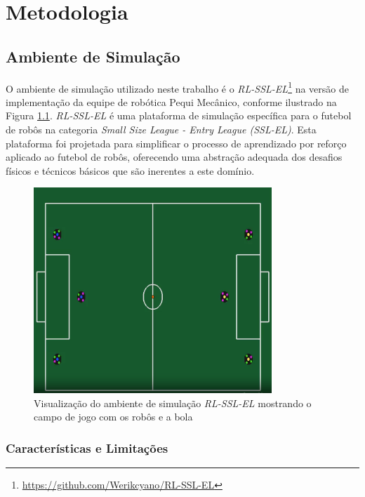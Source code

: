 \chapter{Metodologia}
\label{cap:metodologia}

\section{Ambiente de Simulação}
\label{sec:ambiente_simulacao}

O ambiente de simulação utilizado neste trabalho é o \textit{RL-SSL-EL}\footnote{\url{https://github.com/Werikcyano/RL-SSL-EL}} na versão de implementação da equipe de robótica Pequi Mecânico, conforme ilustrado na Figura \ref{fig:campo_simulacao}. \textit{RL-SSL-EL} é uma plataforma de simulação específica para o futebol de robôs na categoria \textit{Small Size League - Entry League (SSL-EL)}. Esta plataforma foi projetada para simplificar o processo de aprendizado por reforço aplicado ao futebol de robôs, oferecendo uma abstração adequada dos desafios físicos e técnicos básicos que são inerentes a este domínio.

\begin{figure}[h]
    \centering
    \includegraphics[width=0.8\textwidth]{fig/campo}
    \caption{Visualização do ambiente de simulação \textit{RL-SSL-EL} mostrando o campo de jogo com os robôs e a bola}
    \label{fig:campo_simulacao}
\end{figure}

\subsection{Características e Limitações}

